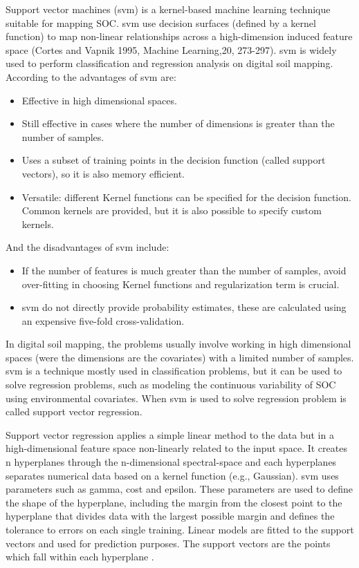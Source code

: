 \documentclass[10pt,b5paper,]{book}
\providecommand{\tightlist}{%
  \setlength{\itemsep}{0pt}\setlength{\parskip}{0pt}}
\theoremstyle{definition}
\theoremstyle{definition}
\theoremstyle{definition}
\theoremstyle{remark}
\begin{document}
Support vector machines (svm) is a kernel-based machine learning
technique suitable for mapping SOC. svm use decision surfaces (defined
by a kernel function) to map non-linear relationships across a
high-dimension induced feature space (Cortes and Vapnik 1995, Machine
Learning,20, 273-297). svm is widely used to perform classification and
regression analysis on digital soil mapping. According to \citet{scikit}
the advantages of svm are:

\begin{itemize}
\tightlist
\item
  Effective in high dimensional spaces.
\item
  Still effective in cases where the number of dimensions is greater
  than the number of samples.
\item
  Uses a subset of training points in the decision function (called
  support vectors), so it is also memory efficient.
\item
  Versatile: different Kernel functions can be specified for the
  decision function. Common kernels are provided, but it is also
  possible to specify custom kernels.
\end{itemize}

And the disadvantages of svm include:

\begin{itemize}
\tightlist
\item
  If the number of features is much greater than the number of samples,
  avoid over-fitting in choosing Kernel functions and regularization
  term is crucial.
\item
  svm do not directly provide probability estimates, these are
  calculated using an expensive five-fold cross-validation.
\end{itemize}

In digital soil mapping, the problems usually involve working in high
dimensional spaces (were the dimensions are the covariates) with a
limited number of samples. svm is a technique mostly used in
classification problems, but it can be used to solve regression
problems, such as modeling the continuous variability of SOC using
environmental covariates. When svm is used to solve regression problem
is called support vector regression.

Support vector regression applies a simple linear method to the data but
in a high-dimensional feature space non-linearly related to the input
space. It creates n hyperplanes through the n-dimensional spectral-space
and each hyperplanes separates numerical data based on a kernel function
(e.g., Gaussian). svm uses parameters such as gamma, cost and epsilon.
These parameters are used to define the shape of the hyperplane,
including the margin from the closest point to the hyperplane that
divides data with the largest possible margin and defines the tolerance
to errors on each single training. Linear models are fitted to the
support vectors and used for prediction purposes. The support vectors
are the points which fall within each hyperplane \citep{soil-2017-40}.
\end{document}
